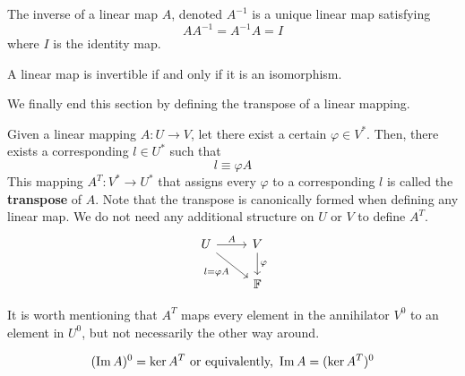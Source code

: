   \begin{definition}[Inverse]
    The inverse of a linear map $A$, denoted $A^{-1}$ is a unique linear map satisfying 
    \begin{equation}
      A A^{-1} = A^{-1} A = I
    \end{equation}
    where $I$ is the identity map. 
  \end{definition}

  \begin{corollary}
    A linear map is invertible if and only if it is an isomorphism. 
  \end{corollary}

  We finally end this section by defining the transpose of a linear mapping. 

  \begin{definition}[Transpose]
    Given a linear mapping $A: U \longrightarrow V$, let there exist a certain $\varphi \in V^*$. Then, there exists a corresponding $l \in U^*$ such that 
    \begin{equation}
      l \equiv \varphi A
    \end{equation}
    This mapping $A^T: V^* \longrightarrow U^*$ that assigns every $\varphi$ to a corresponding $l$ is called the \textbf{transpose} of $A$. Note that the transpose is canonically formed when defining any linear map. We do not need any additional structure on $U$ or $V$ to define $A^T$.
    \[
      \begin{tikzcd}
        U \arrow{r}{A} \arrow[swap]{dr}{l = \varphi A} & V \arrow{d}{\varphi} \\
        & \mathbb{F}
      \end{tikzcd}
    \]
  \end{definition}

  It is worth mentioning that $A^T$ maps every element in the annihilator $V^0$ to an element in $U^0$, but not necessarily the other way around. 

  \begin{theorem}
    \begin{equation}
      (\im A)^0 = \ker A^T \text{ or equivalently, } \im A = (\ker A^T)^0
    \end{equation}
  \end{theorem}

